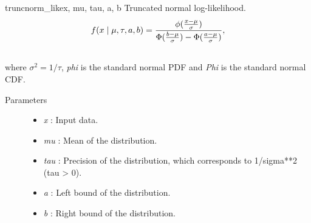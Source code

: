 \hypertarget{pymc.distributions.truncnorm_like}{}\begin{funcdesc}{truncnorm\_like}{x, mu, tau, a, b}
Truncated normal log-likelihood.
\begin{gather}
\begin{split}f(x \mid \mu, \tau, a, b) = \frac{\phi(\frac{x-\mu}{\sigma})} {\Phi(\frac{b-\mu}{\sigma}) - \Phi(\frac{a-\mu}{\sigma})},\end{split}\notag\\\begin{split}\end{split}\notag
\end{gather}
where $\sigma^2=1/\tau$, \emph{phi} is the standard normal PDF and \emph{Phi} is the standard normal CDF.
\begin{description}
\item[Parameters] \leavevmode\begin{itemize}
\item {} 
\emph{x} : Input data.

\item {} 
\emph{mu} : Mean of the distribution.

\item {} 
\emph{tau} : Precision of the distribution, which corresponds to 1/sigma**2 (tau \textgreater{} 0).

\item {} 
\emph{a} : Left bound of the distribution.

\item {} 
\emph{b} : Right bound of the distribution.

\end{itemize}

\end{description}
\end{funcdesc}

